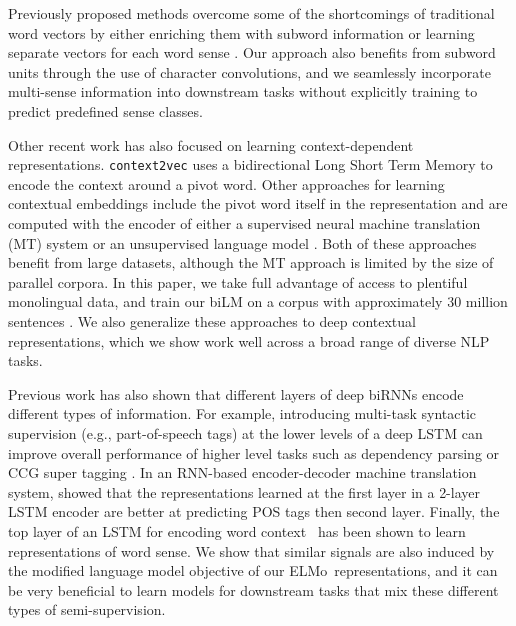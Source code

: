 \documentclass[11pt,a4paper]{article}
\newcommand{\ELMO}{ELMo}
\begin{document}
Previously proposed methods overcome some of the shortcomings of traditional word vectors by either enriching them with subword information \citep[e.g., ][]{Wieting2016CharagramEW,Bojanowski2017EnrichingWV} or learning separate vectors for each word sense \citep[e.g., ][]{Neelakantan2014EfficientNE}.
Our approach also benefits from subword units through the use of character convolutions, and we seamlessly incorporate multi-sense information into downstream tasks without explicitly training to predict predefined sense classes.


Other recent work has also focused on learning context-dependent representations.
\texttt{context2vec} \citep{Melamud2016context2vecLG} uses a bidirectional Long Short Term Memory \citep[LSTM; ][]{LSTM:Hochreiter1997} to encode the context around a pivot word. Other approaches for learning contextual embeddings include the pivot word itself in the representation and are computed with the encoder of either a supervised neural machine translation (MT) system \citep[CoVe; ][]{McCann2017LearnedIT} or an unsupervised language model \citep{Peters2017SemisupervisedST}.
Both of these approaches benefit from large datasets, although the MT approach is limited by the size of parallel corpora.
In this paper, we take full advantage of access to plentiful monolingual data, and train our biLM 
on a corpus with approximately 30 million sentences \citep{Chelba2014OneBW}.
We also generalize these approaches to deep contextual representations, which we show work well across a broad range of diverse NLP tasks. 

Previous work has also shown that different layers of deep biRNNs encode different types of information.
For example, introducing multi-task syntactic supervision (e.g., part-of-speech tags) at the lower levels of a deep LSTM can improve overall performance of higher level tasks such as dependency parsing \citep{joint-many-iclr07} or CCG super tagging \citep{Sgaard2016DeepML}.
In an RNN-based encoder-decoder machine translation system, \citet{Belinkov2017WhatDN} showed that the representations learned at the first layer
in a 2-layer LSTM encoder are better at predicting POS tags then second layer.
Finally, the top layer of an LSTM for encoding word context~\citep{Melamud2016context2vecLG} has been shown to learn representations of word sense. We show that similar signals are also induced by the modified language model objective of our \ELMO\ representations, and it can be very beneficial to learn models for downstream tasks that mix these different types of semi-supervision. 
\end{document}
